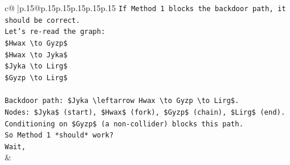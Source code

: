 \documentclass{article}
\begin{document}
{\begin{supertabular}{c@{$\;$}|p{.15\linewidth}@{}p{.15\linewidth}p{.15\linewidth}p{.15\linewidth}p{.15\linewidth}p{.15\linewidth}}
{{{\texttt{If Method 1 blocks the backdoor path, it should be correct.} \\
\texttt{Let's re{-}read the graph:} \\
\texttt{\$Hwax \textbackslash{}to Gyzp\$} \\
\texttt{\$Hwax \textbackslash{}to Jyka\$} \\
\texttt{\$Jyka \textbackslash{}to Lirg\$} \\
\texttt{\$Gyzp \textbackslash{}to Lirg\$} \\
\\ 
\texttt{Backdoor path: \$Jyka \textbackslash{}leftarrow Hwax \textbackslash{}to Gyzp \textbackslash{}to Lirg\$.} \\
\texttt{Nodes: \$Jyka\$ (start), \$Hwax\$ (fork), \$Gyzp\$ (chain), \$Lirg\$ (end).} \\
\texttt{Conditioning on \$Gyzp\$ (a non{-}collider) blocks this path.} \\
\texttt{So Method 1 *should* work?} \\
\texttt{Wait,} \\
            }
        }
    }
    & \\ \\

\end{supertabular}
}
\end{document}
